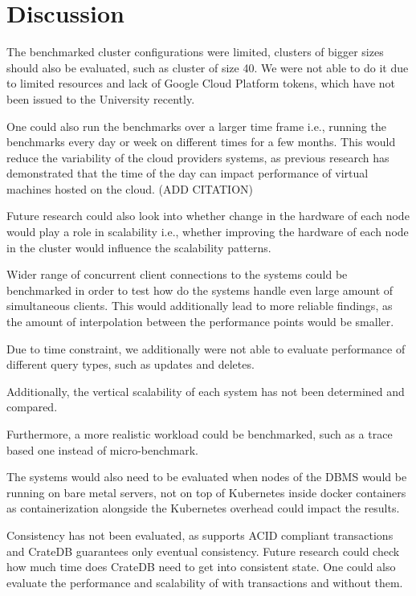 \section{Discussion}
\label{cha:discussion}

The benchmarked cluster configurations were limited, clusters of bigger sizes should also be evaluated, such as cluster of size 40.
We were not able to do it due to limited resources and lack of Google Cloud Platform tokens, which have not been issued to the University recently.

One could also run the benchmarks over a larger time frame i.e., running the benchmarks every day or week on different times for a few months.
This would reduce the variability of the cloud providers systems, as previous research has demonstrated that the time of the day can impact performance of virtual machines hosted on the cloud. (ADD CITATION)

Future research could also look into whether change in the hardware of each node would play a role in scalability i.e., whether improving the hardware of each node in the cluster would influence the scalability patterns.

Wider range of concurrent client connections to the systems could be benchmarked in order to test how do the systems handle even large amount of simultaneous clients.
This would additionally lead to more reliable findings, as the amount of interpolation between the performance points would be smaller.

Due to time constraint, we additionally were not able to evaluate performance of different query types, such as updates and deletes.

Additionally, the vertical scalability of each system has not been determined and compared.

Furthermore, a more realistic workload could be benchmarked, such as a trace based one instead of micro-benchmark.

The systems would also need to be evaluated when nodes of the DBMS would be running on bare metal servers, not on top of Kubernetes inside docker containers as containerization alongside the Kubernetes overhead could impact the results.

Consistency has not been evaluated, as \mobilitydbc supports ACID compliant transactions and CrateDB guarantees only eventual consistency.
Future research could check how much time does CrateDB need to get into consistent state.
One could also evaluate the performance and scalability of \mobilitydbc with transactions and without them.
